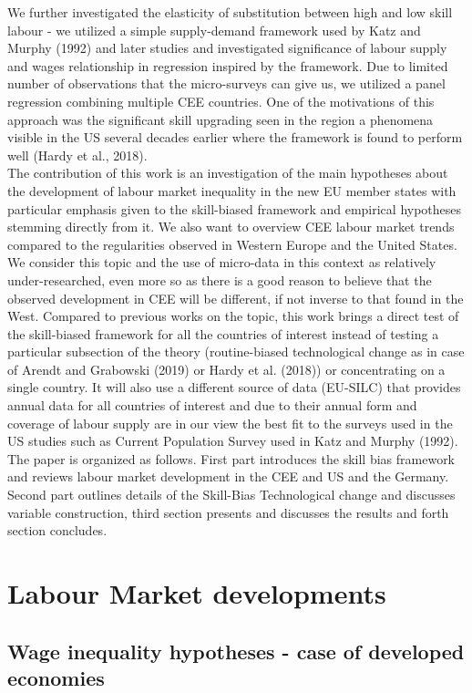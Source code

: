 \documentclass{article}
\begin{document}
We further investigated the elasticity of substitution between high and low skill labour - we utilized a simple supply-demand framework used by Katz and Murphy (1992) and later studies and investigated significance of labour supply and wages relationship in regression inspired by the framework. Due to limited number of observations that the micro-surveys can give us, we utilized a panel regression combining multiple CEE countries. One of the motivations of this approach was the significant skill upgrading seen in the region a phenomena visible in the US several decades earlier where the framework is found to perform well (Hardy et al., 2018).
\\
The contribution of this work is an investigation of the main hypotheses about the development of labour market inequality in the new EU member states with particular emphasis given to the skill-biased framework and empirical hypotheses stemming directly from it. We also want to overview CEE labour market trends compared to the regularities observed in Western Europe and the United States. We consider this topic and the use of micro-data in this context as relatively under-researched, even more so as there is a good reason to believe that the observed development in CEE will be different, if not inverse to that found in the West. Compared to previous works on the topic, this work brings a direct test of the skill-biased framework for all the countries of interest instead of testing a particular subsection of the theory (routine-biased technological change as in case of Arendt and Grabowski (2019) or Hardy et al. (2018)) or concentrating on a single country. It will also use a different source of data (EU-SILC) that provides annual data for all countries of interest and due to their annual form and coverage of labour supply are in our view the best fit to the surveys used in the US studies such as Current Population Survey used in Katz and Murphy (1992). \\
The paper is organized as follows. First part introduces the skill bias framework and reviews labour market development in the CEE and US and the Germany. Second part outlines details of the Skill-Bias Technological change and discusses variable construction, third section presents and discusses the results and forth section concludes.

\section{Labour Market developments}
\subsection{Wage inequality hypotheses - case of developed economies}
\end{document}
